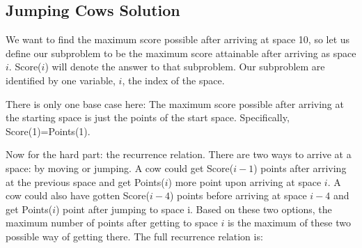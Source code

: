 \documentclass[11pt]{article}
\begin{document}
\begin{figure}[h]
\centering
{
}
\end{figure}
\newpage
\subsection{Jumping Cows Solution}

We want to find the maximum score possible after arriving at space 10, so let us define our subproblem to be the maximum score attainable after arriving as space $i$.  Score($i$) will denote the answer to that subproblem.  Our subproblem are identified by one variable, $i$, the index of the space.

There is only one base case here: The maximum score possible after arriving at the starting space is just the points of the start space.  Specifically, Score(1)=Points(1).

Now for the hard part: the recurrence relation.  There are two ways to arrive at a space: by moving or jumping.  A cow could get Score($i-1$) points after arriving at the previous space and get Points($i$) more point upon arriving at space $i$.  A cow could also have gotten Score($i-4$) points before arriving at space $i-4$ and get Points($i$) point after jumping to space i.  Based on these two options, the maximum number of points after getting to space $i$ is the maximum of these two possible way of getting there.  The full recurrence relation is:
\end{document}
